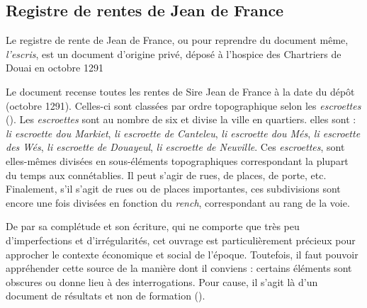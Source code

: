 \subsection{Registre de rentes de Jean de France}
Le registre de rente de Jean de France, ou pour reprendre du document même, \textit{l'escris}, est un document d'origine privé, déposé à l'hospice des Chartriers de Douai en octobre 1291 

Le document recense toutes les rentes de Sire Jean de France à la date du dépôt (octobre 1291). Celles-ci sont classées par ordre topographique selon les \textit{escroettes} (\cite{espinas_les_1933}). Les \textit{escroettes} sont au nombre de six et divise la ville en quartiers. elles sont : \textit{li escroette dou Markiet}, \textit{li escroette de Canteleu}, \textit{li escroette dou Més}, \textit{li escroette des Wés}, \textit{li escroette de Douayeul}, \textit{li escroette de Neuville}.
Ces \textit{escroettes}, sont elles-mêmes divisées en sous-éléments topographiques correspondant la plupart du temps aux connétablies. Il peut s'agir de rues, de places, de porte, etc. Finalement, s'il s'agit de rues ou de places importantes, ces subdivisions sont encore une fois divisées en fonction du \textit{rench}, correspondant au rang de la voie.

De par sa complétude et son écriture, qui ne comporte que très peu d'imperfections et d'irrégularités, cet ouvrage est particulièrement précieux pour approcher le contexte économique et social de l'époque. 
Toutefois, il faut pouvoir appréhender cette source de la manière dont il conviens : certains éléments sont obscures ou donne lieu à des interrogations. Pour cause, il s'agit là d'un document de résultats et non de formation (\cite{espinas_les_1933}).


